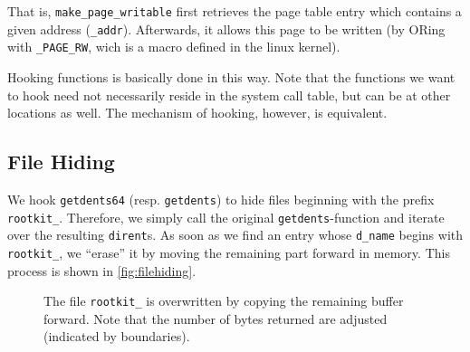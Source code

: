 \documentclass[10pt, letterpaper]{article}
\newcommand{\todo}[1]{}%
\begin{document}
That is, \texttt{make\_page\_writable} first retrieves the page table entry which contains a given address (\texttt{\_addr}). Afterwards, it allows this page to be written (by ORing with \texttt{\_PAGE\_RW}, wich is a macro defined in the linux kernel). \todo{Is this correct, what I'm writing here?}

Hooking functions is basically done in this way. Note that the functions we want to hook need not necessarily reside in the system call table, but can be at other locations as well. The mechanism of hooking, however, is equivalent.

\subsection{File Hiding}
\label{filehiding}

We hook \texttt{getdents64} (resp. \texttt{getdents}) to hide files beginning with the prefix \texttt{rootkit\_}. 
Therefore, we simply call the original \texttt{getdents}-function and iterate over the resulting
\texttt{dirent}s. As soon as we find an entry whose \texttt{d\_name} begins with \texttt{rootkit\_},
we ``erase'' it by moving the remaining part forward in memory. This process is shown in \autoref{fig:filehiding}.


\begin{figure}[ht]
\centering
{}
\caption{The file \texttt{rootkit\_} is overwritten by copying the remaining buffer forward. Note that the number of bytes returned are adjusted (indicated by boundaries).}
\label{fig:filehiding}
\end{figure}
\end{document}

